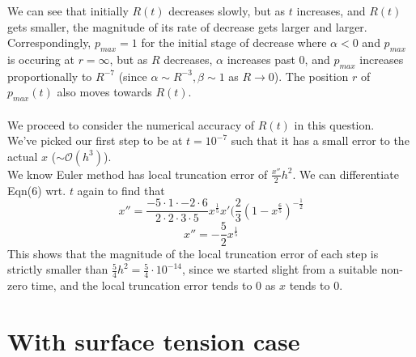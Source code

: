 \documentclass[10pt]{article}
\begin{document}
We can see that initially $R(t)$ decreases slowly, but as $t$ increases, and $R(t)$ gets smaller, the magnitude of its rate of decrease gets larger and larger.\\ Correspondingly, $p_{max}=1$ for the initial stage of decrease where $\alpha<0$ and $p_{max}$ is occuring at $r=\infty$, but as $R$ decreases, $\alpha$ increases past 0, and $p_{max}$ increases proportionally to $R^{-7}$ (since $\alpha\sim R^{-3}, \beta\sim1$ as $R\to0$). The position $r$ of $p_{max}(t)$ also moves towards $R(t)$.\\\\
We proceed to consider the numerical accuracy of $R(t)$ in this question.\\
We've picked our first step to be at $t=10^{-7}$ such that it has a small error to the actual $x$ ($\sim\mathcal{O}(h^3)$).\\
We know Euler method has local truncation error of $\frac{x''}{2}h^2$. We can differentiate Eqn(6) wrt. $t$ again to find that \[x''=\frac{-5\cdot1\cdot-2\cdot6}{2\cdot2\cdot3\cdot5}x^{\frac{1}{5}}x'(\frac{2}{3}(1-x^{\frac{6}{5}})^{-\frac{1}{2}}\]
\[x''=-\frac{5}{2}x^{\frac{1}{5}}\]
This shows that the magnitude of the local truncation error of each step is strictly smaller than $\frac{5}{4}h^2=\frac{5}{4}\cdot 10^{-14}$, since we started slight from a suitable non-zero time, and the local truncation error tends to 0 as $x$ tends to 0.\\

\section*{With surface tension case}
\end{document}
